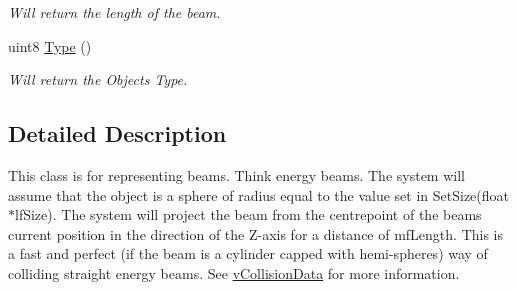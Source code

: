\begin{DoxyCompactItemize}
\begin{DoxyCompactList}\small\item\em Will return the length of the beam. \end{DoxyCompactList}\item 
\hypertarget{classc_beam_collision_ab7a645cc905fc9c62bfd6a1440d349b1}{
uint8 \hyperlink{classc_beam_collision_ab7a645cc905fc9c62bfd6a1440d349b1}{Type} ()}
\label{classc_beam_collision_ab7a645cc905fc9c62bfd6a1440d349b1}

\begin{DoxyCompactList}\small\item\em Will return the Objects Type. \end{DoxyCompactList}\end{DoxyCompactItemize}


\subsection{Detailed Description}
This class is for representing beams. Think energy beams. The system will assume that the object is a sphere of radius equal to the value set in SetSize(float $\ast$lfSize). The system will project the beam from the centrepoint of the beams current position in the direction of the Z-\/axis for a distance of mfLength. This is a fast and perfect (if the beam is a cylinder capped with hemi-\/spheres) way of colliding straight energy beams. See \hyperlink{classv_collision_data}{vCollisionData} for more information. 